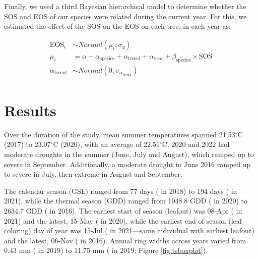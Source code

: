 Finally, we used a third Bayesian hierarchical model to determine whether the SOS and EOS of our species were related during the current year. For this, we estimated the effect of the SOS on the EOS on each tree, in each year as: 

\begin{equation}
\begin{aligned}
\text{EOS}_i &\sim Normal(\mu_i, \sigma_y) \\
\mu_i &= \alpha + \alpha_{\text{species}} + \alpha_{\text{treeid}} + \alpha_{\text{year}} + \beta_{\text{species}} \times \text{SOS} \\[4pt]
\alpha_{\text{treeid}} &\sim Normal(0, \sigma_{\alpha_{\text{treeid}}}) \\
\end{aligned}
\label{eq:SOSonEOSMdl}
\end{equation}

\section{Results}

Over the duration of the study, mean summer temperatures spanned 
21.53$^\circ$C 
(2017) to 
23.07$^\circ$C 
(2020), with an average of
22.51$^\circ$C. 2020 and 2022 had moderate droughts in the summer (June, July and August), which ramped up to severe in September. Additionally, a moderate drought in June 2016 ramped up to severe in July, then extreme in August and September. 

The calendar season (GSL) ranged from 
77 days ({\Afla} in 
2018) to 
194 days ({\Asac} in 
2021), while the thermal season (GDD) ranged from 
1048.8 GDD ({\Afla} in 
2020) to 
2634.7 GDD ({\Tame} in 
2016). The earliest start of season (leafout) was 
08-Apr ({\Afla} in 
2021) and the latest, 
15-May ({\Cova} in 
2020), while the earliest end of season (leaf coloring) day of year was
15-Jul ({\Afla} in 
2021---same individual with earliest leafout) and the latest, 
06-Nov ({\Tame} in
2016). Annual ring widths across years varied from 
0.43 mm ({\Asac} in 2019) to 
11.75 mm ({\Tame} in 2019; Figure \ref{fig:tsboxplot}). 

